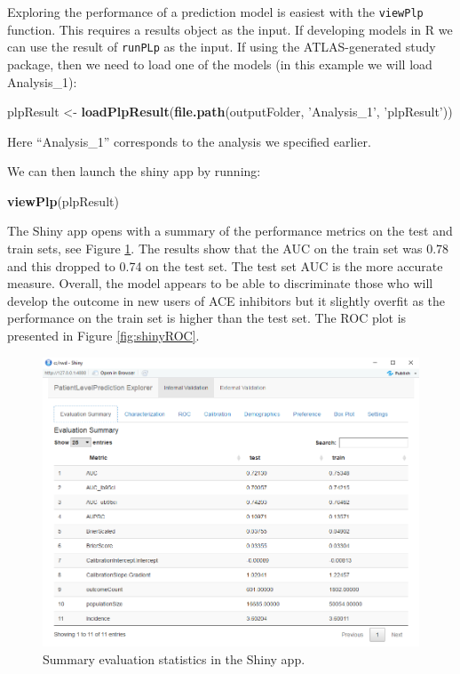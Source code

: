 \documentclass[11pt]{book}
\newenvironment{Shaded}{\begin{snugshade}}{\end{snugshade}}
\newcommand{\KeywordTok}[1]{\textcolor[rgb]{0.13,0.29,0.53}{\textbf{#1}}}
\newcommand{\NormalTok}[1]{#1}
\newcommand{\StringTok}[1]{\textcolor[rgb]{0.31,0.60,0.02}{#1}}
\theoremstyle{definition}
\theoremstyle{definition}
\theoremstyle{definition}
\theoremstyle{remark}
\begin{document}
Exploring the performance of a prediction model is easiest with the \texttt{viewPlp} function. This requires a results object as the input. If developing models in R we can use the result of \texttt{runPLp} as the input. If using the ATLAS-generated study package, then we need to load one of the models (in this example we will load Analysis\_1): 

\begin{Shaded}
\begin{Highlighting}[]
\NormalTok{plpResult <-}\StringTok{ }\KeywordTok{loadPlpResult}\NormalTok{(}\KeywordTok{file.path}\NormalTok{(outputFolder, }
                                     \StringTok{'Analysis_1'}\NormalTok{, }
                                     \StringTok{'plpResult'}\NormalTok{))}
\end{Highlighting}
\end{Shaded}

Here ``Analysis\_1'' corresponds to the analysis we specified earlier.

We can then launch the shiny app by running:

\begin{Shaded}
\begin{Highlighting}[]
\KeywordTok{viewPlp}\NormalTok{(plpResult)}
\end{Highlighting}
\end{Shaded}

The Shiny app opens with a summary of the performance metrics on the test and train sets, see Figure \ref{fig:shinySummary}. The results show that the AUC on the train set was 0.78 and this dropped to 0.74 on the test set. The test set AUC is the more accurate measure. Overall, the model appears to be able to discriminate those who will develop the outcome in new users of ACE inhibitors but it slightly overfit as the performance on the train set is higher than the test set. The ROC plot is presented in Figure \ref{fig:shinyROC}.

\begin{figure}
\includegraphics[width=1\linewidth]{images/PatientLevelPrediction/shinysummary} \caption{Summary evaluation statistics in the Shiny app.}\label{fig:shinySummary}
\end{figure}
\end{document}
